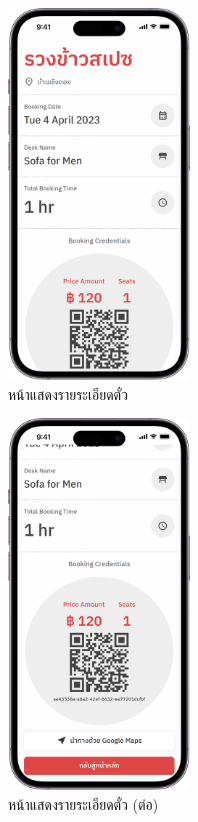 \begin{figure}[ht]
    \begin{center}
    \includegraphics[width=1.9in]{./image/Flowy_ticket_1.png}
    \end{center}
    \caption[Flowy ticket 1]{หน้าแสดงรายระเอียดตั๋ว}
    \label{fig:Flowy_ticket_1}
\end{figure}
\begin{figure}[ht]
    \begin{center}
    \includegraphics[width=1.9in]{./image/Flowy_ticket_2.png}
    \end{center}
    \caption[Flowy ticket 2]{หน้าแสดงรายระเอียดตั๋ว (ต่อ)}
    \label{fig:Flowy_ticket_2}
\end{figure}
